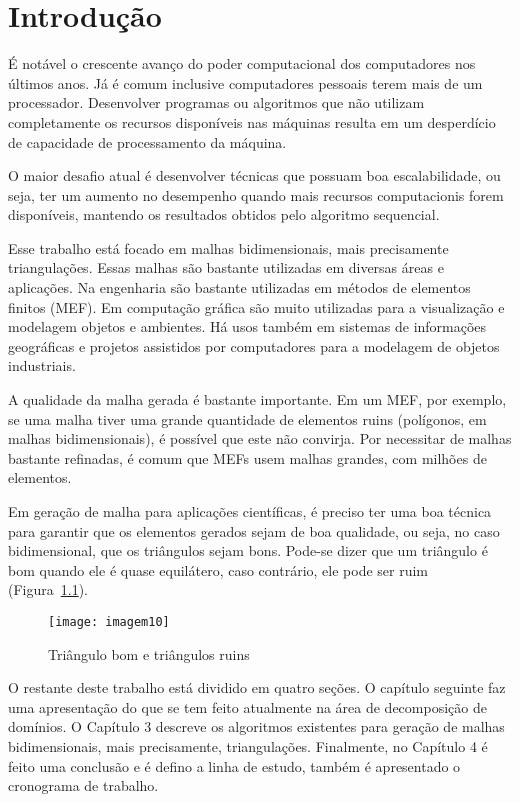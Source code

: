 \cleardoublepage
\pagestyle{fancy}

\chapter{Introdução}\label{intro}
É notável o crescente avanço do poder computacional dos computadores nos últimos anos. Já é comum inclusive computadores pessoais terem mais de um processador. Desenvolver programas ou algoritmos que não utilizam completamente os recursos disponíveis nas máquinas resulta em um desperdício de capacidade de processamento da máquina.

O maior desafio atual é desenvolver técnicas que possuam boa escalabilidade, ou seja, ter um aumento no desempenho quando mais recursos computacionis forem disponíveis, mantendo os resultados obtidos pelo algoritmo sequencial.

Esse trabalho está focado em malhas bidimensionais, mais precisamente triangulações. Essas malhas são bastante utilizadas em diversas áreas e aplicações. Na engenharia são bastante utilizadas em métodos de elementos finitos (MEF). Em computação gráfica são muito utilizadas para a visualização e modelagem objetos e ambientes. Há usos também em  sistemas de informações geográficas e projetos assistidos por computadores para a modelagem de objetos industriais.

A qualidade da malha gerada é bastante importante. Em um MEF, por exemplo, se uma malha tiver uma grande quantidade de elementos ruins (polígonos, em malhas bidimensionais), é possível que este não convirja. Por necessitar de malhas bastante refinadas, é comum que MEFs usem malhas grandes, com milhões de elementos.

Em geração de malha para aplicações científicas, é preciso ter uma boa técnica para garantir que os elementos gerados sejam de boa qualidade, ou seja, no caso bidimensional, que os triângulos sejam bons. Pode-se dizer que um triângulo é bom quando ele é quase equilátero, caso contrário, ele pode ser ruim (Figura~\ref{fig:imagem10}).

 \begin{figure}[htbp]
     \centering
     \texttt{[image: imagem10]}
     \caption{Triângulo bom e triângulos ruins} 
     \label{fig:imagem10}
 \end{figure}

O restante deste trabalho está dividido em quatro seções. O capítulo seguinte faz uma apresentação do que se tem feito atualmente na área de decomposição de domínios. O Capítulo 3 descreve os algoritmos existentes para geração de malhas bidimensionais, mais precisamente, triangulações. Finalmente, no Capítulo 4 é feito uma conclusão e é defino a linha de estudo, também é apresentado o cronograma de trabalho.

